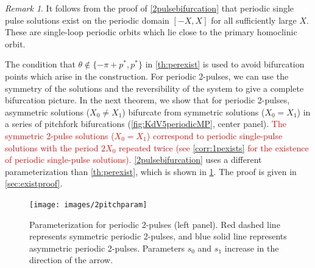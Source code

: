 \documentclass[12pt]{elsarticle}
\theoremstyle{plain}
\theoremstyle{definition}
\theoremstyle{remark}
\newtheorem{remark}[theorem]{Remark}
\numberwithin{theorem}{section}
\numberwithin{equation}{section}
\newcommand{\revised}[1]{ \textcolor{red}{#1} }
\begin{document}
\begin{remark}
It follows from the proof of \cref{2pulsebifurcation} that periodic single pulse solutions exist on the periodic domain $[-X, X]$ for all sufficiently large $X$. These are single-loop periodic orbits which lie close to the primary homoclinic orbit.
\end{remark}

The condition that $\theta \notin \{-\pi + p^*, p^* \}$ in \cref{th:perexist} is used to avoid bifurcation points which arise in the construction. For periodic 2-pulses, we can use the symmetry of the solutions and the reversibility of the system to give a complete bifurcation picture. In the next theorem, we show that for periodic 2-pulses, asymmetric solutions ($X_0 \neq X_1$) bifurcate from symmetric solutions ($X_0 = X_1$) in a series of pitchfork bifurcations (\cref{fig:KdV5periodicMP}, center panel). 
\revised{
The symmetric 2-pulse solutions ($X_0 = X_1$) correspond to periodic single-pulse solutions with the period $2X_0$ repeated twice (see \cref{corr:1pexists} for the existence of periodic single-pulse solutions). 
}
\cref{2pulsebifurcation} uses a different parameterization than \cref{th:perexist}, which is shown in \cref{fig:2pitch}. The proof is given in \cref{sec:existproof}. 

\begin{figure}
\begin{center}
\texttt{[image: images/2pitchparam]}
\end{center}
\caption[Parameterization for periodic 2-pulses]{Parameterization for periodic 2-pulses (left panel). Red dashed line represents symmetric periodic 2-pulses, and blue solid line represents asymmetric periodic 2-pulses. Parameters $s_0$ and $s_1$ increase in the direction of the arrow.}
\label{fig:2pitch}
\end{figure} 
\end{document}
